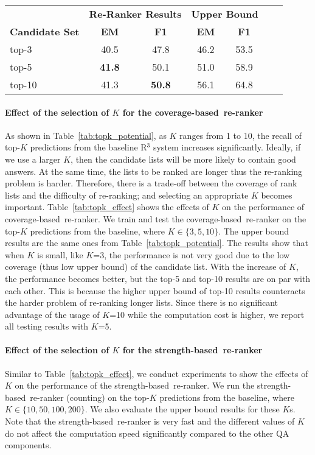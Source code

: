 \documentclass{article} \usepackage{iclr2018_conference,times}
\def \coherence {strength-based}
\def \union {coverage-based}
\begin{document}
\begin{table*}[t]
\centering
\begin{tabular}{lcccccc}
\toprule
                  & \multicolumn{2}{c}{\bf Re-Ranker Results} & \multicolumn{2}{c}{\bf Upper Bound} \\
    \bf Candidate Set             & \bf EM            & \bf F1            & \bf EM            & \bf F1 \\
\midrule
top-3 & 40.5 & 47.8 & 46.2 & 53.5  \\
top-5   & \textbf{41.8} & 50.1  & 51.0 & 58.9  \\
top-10  & 41.3 & \textbf{50.8} & 56.1 & 64.8   \\
\bottomrule
\end{tabular}
\normalsize
\caption{Results of running \union\ re-ranker on different number of the top-$K$ answer candidates on Quasar-T (dev set).}
\label{tab:topk_effect}
\end{table*}
\paragraph{Effect of the selection of $K$ for the \union\ re-ranker}
As shown in Table~\ref{tab:topk_potential}, as $K$ ranges from 1 to 10, the recall of top-$K$ predictions from the baseline R$^3$ system increases significantly. Ideally, if we use a larger $K$, then the candidate lists will be more likely to contain good answers. At the same time, the lists to be ranked are longer thus the re-ranking problem is harder. Therefore, there is a trade-off between the coverage of rank lists and the difficulty of re-ranking; and selecting an appropriate $K$ becomes important.
Table~\ref{tab:topk_effect} shows the effects of $K$ on the performance of \union\ re-ranker.
We train and test the \union\ re-ranker on the top-$K$ predictions from the baseline, where $K \in \{3, 5, 10\}$.
The upper bound results are the same ones from Table~\ref{tab:topk_potential}. The results show that when $K$ is small, like $K$=3, the performance is not very good due to the low coverage (thus low upper bound) of the candidate list. With the increase of $K$, the performance becomes better, but the top-5 and top-10 results are on par with each other. This is because the higher upper bound of top-10 results counteracts the harder problem of re-ranking longer lists. Since there is no significant advantage of the usage of $K$=10 while the computation cost is higher, we report all testing results with $K$=5.

\paragraph{Effect of the selection of $K$ for the \coherence\ re-ranker}
Similar to Table~\ref{tab:topk_effect}, we conduct experiments to show the effects of $K$ on the performance of the \coherence\ re-ranker. We run the \coherence\ re-ranker (counting) on the top-$K$ predictions from the baseline, where $K \in \{10, 50, 100, 200\}$. We also evaluate the upper bound results for these $K$s. Note that the \coherence\ re-ranker is very fast and the different values of $K$ do not affect the computation speed significantly compared to the other QA components. 
\end{document}
